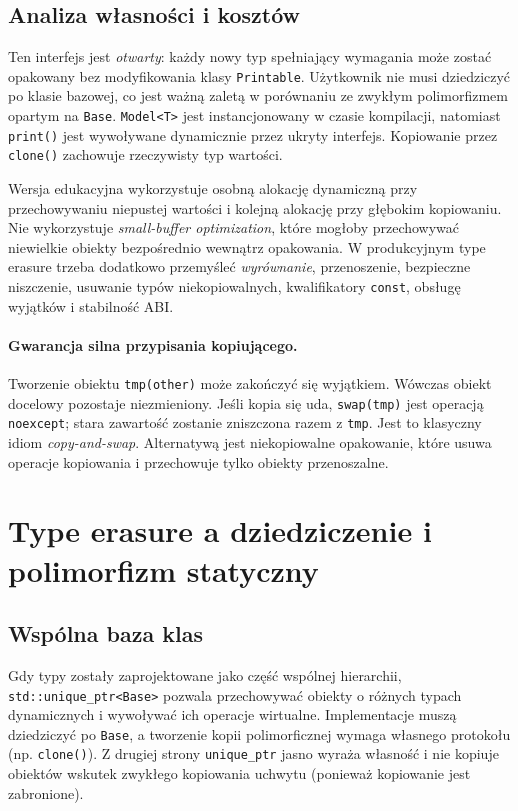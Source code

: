 \subsection{Analiza własności i kosztów}

Ten interfejs jest \emph{otwarty}: każdy nowy typ spełniający wymagania
może zostać opakowany bez modyfikowania klasy \texttt{Printable}.
Użytkownik nie musi dziedziczyć po klasie bazowej, co jest ważną zaletą
w porównaniu ze zwykłym polimorfizmem opartym na \texttt{Base}.
\texttt{Model<T>} jest instancjonowany w czasie kompilacji, natomiast
\texttt{print()} jest wywoływane dynamicznie przez ukryty interfejs.
Kopiowanie przez \texttt{clone()} zachowuje rzeczywisty typ wartości.

Wersja edukacyjna wykorzystuje osobną alokację dynamiczną przy
przechowywaniu niepustej wartości i kolejną alokację przy głębokim
kopiowaniu. Nie wykorzystuje \emph{small-buffer optimization}, które
mogłoby przechowywać niewielkie obiekty bezpośrednio wewnątrz opakowania.
W produkcyjnym type erasure trzeba dodatkowo przemyśleć \emph{wyrównanie},
przenoszenie, bezpieczne niszczenie, usuwanie typów niekopiowalnych,
kwalifikatory \texttt{const}, obsługę wyjątków i stabilność ABI.

\paragraph{Gwarancja silna przypisania kopiującego.}
Tworzenie obiektu \texttt{tmp(other)} może zakończyć się wyjątkiem.
Wówczas obiekt docelowy pozostaje niezmieniony. Jeśli kopia się uda,
\texttt{swap(tmp)} jest operacją \texttt{noexcept}; stara zawartość
zostanie zniszczona razem z \texttt{tmp}. Jest to klasyczny idiom
\emph{copy-and-swap}. Alternatywą jest niekopiowalne opakowanie,
które usuwa operacje kopiowania i przechowuje tylko obiekty przenoszalne.

\section{Type erasure a dziedziczenie i polimorfizm statyczny}
\label{sec:cpp14-comparison}

\subsection{Wspólna baza klas}

Gdy typy zostały zaprojektowane jako część wspólnej hierarchii,
\texttt{std::unique\_ptr<Base>} pozwala przechowywać obiekty o różnych
typach dynamicznych i wywoływać ich operacje wirtualne. Implementacje
muszą dziedziczyć po \texttt{Base}, a tworzenie kopii polimorficznej
wymaga własnego protokołu (np. \texttt{clone()}). Z drugiej strony
\texttt{unique\_ptr} jasno wyraża własność i nie kopiuje obiektów
wskutek zwykłego kopiowania uchwytu (ponieważ kopiowanie jest zabronione).

